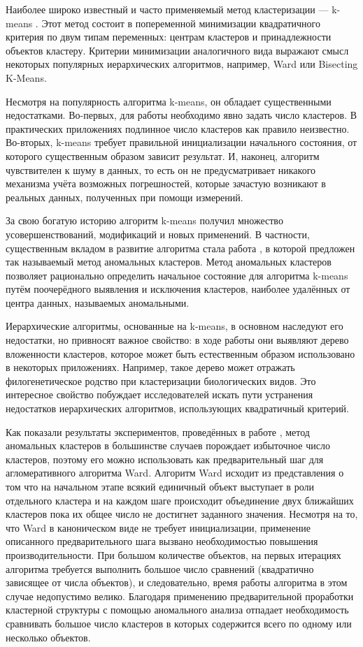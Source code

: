 \documentclass[12pt]{a&t}
\begin{document}
Наиболее широко известный и часто применяемый метод кластеризации --- \mbox{k-means} \cite{K-Means-canonical}. Этот метод состоит в попеременной минимизации квадратичного критерия по двум типам переменных: центрам кластеров и принадлежности объектов кластеру. Критерии минимизации аналогичного вида выражают смысл некоторых популярных иерархических алгоритмов, например, Ward \cite{Ward-canonical} или Bisecting \mbox{K-Means}\cite{Mirkin-Clustering-A-Data-Recovery-Approach}.

Несмотря на популярность алгоритма \mbox{k-means}, он обладает существенными недостатками. Во-первых, для работы необходимо явно задать число кластеров. В практических приложениях подлинное число кластеров как правило неизвестно. Во-вторых, \mbox{k-means} требует правильной инициализации начального состояния, от которого существенным образом зависит результат. И, наконец, алгоритм чувствителен к шуму в данных, то есть он не предусматривает никакого механизма учёта возможных погрешностей, которые зачастую возникают в реальных данных, полученных при помощи измерений.

За свою богатую историю алгоритм \mbox{k-means} получил множество усовершенствований, модификаций и новых применений. В частности, существенным вкладом в развитие алгоритма стала работа \cite{Anomalous-Clustring}, в которой предложен так называемый метод аномальных кластеров. Метод аномальных кластеров позволяет рационально определить начальное состояние для алгоритма \mbox{k-means} путём поочерёдного выявления и исключения кластеров, наиболее удалённых от центра данных, называемых аномальными. 

Иерархические алгоритмы, основанные на \mbox{k-means}, в основном наследуют его недостатки, но привносят важное свойство: в ходе работы они выявляют дерево вложенности кластеров, которое может быть естественным образом использовано в некоторых приложениях. Например, такое дерево может отражать  филогенетическое родство при кластеризации биологических видов. Это интересное свойство побуждает исследователей искать пути устранения недостатков иерархических алгоритмов, использующих квадратичный критерий. 

Как показали результаты экспериментов, проведённых в работе \cite{Amorim-Makarenkov-Mirkin}, метод аномальных кластеров в большинстве случаев порождает избыточное число кластеров, поэтому его можно использовать как предварительный шаг для агломеративного алгоритма Ward. Алгоритм Ward исходит из представления о том что на начальном этапе всякий единичный объект выступает в роли отдельного кластера и на каждом шаге происходит объединение двух ближайших кластеров пока их общее число не достигнет заданного значения.  Несмотря на то, что Ward в каноническом виде не требует инициализации, применение описанного предварительного шага вызвано необходимостью повышения производительности. При большом количестве объектов, на первых итерациях алгоритма требуется выполнить большое число сравнений (квадратично зависящее от числа объектов), и следовательно, время работы алгоритма в этом случае недопустимо велико. Благодаря применению предварительной проработки кластерной структуры с помощью аномального анализа отпадает необходимость сравнивать большое число кластеров в которых содержится всего по одному или несколько объектов. 
\end{document}
